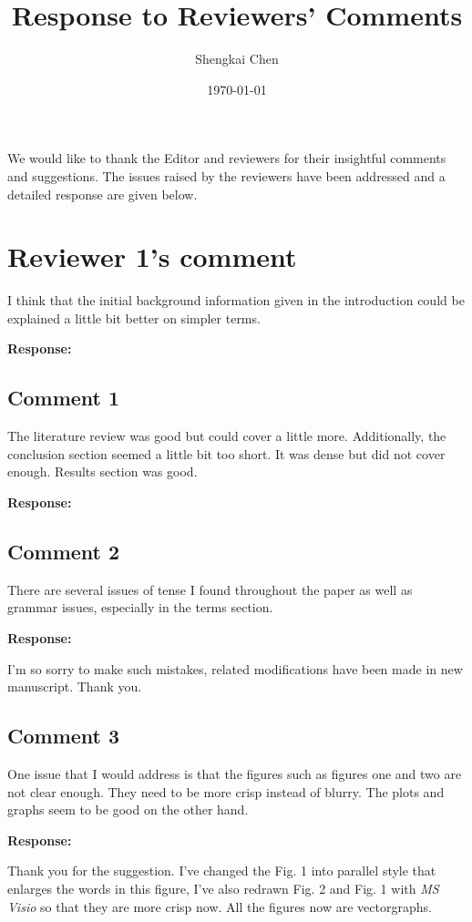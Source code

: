 \documentclass{article}
\author{Shengkai Chen}
\date{\today}
\title{Response to Reviewers' Comments}
\begin{document}
\maketitle

We would like to thank the Editor and reviewers for their insightful comments and suggestions. The issues raised by the reviewers have been addressed and a detailed response are given below.

\setlength\parindent{0pt}

\section*{Reviewer 1's comment}
I think that the initial background information given in the introduction could be explained a little bit better on simpler terms.

\textbf{Response:}


\subsection*{Comment 1} %
The literature review was good but could cover a little more. Additionally, the conclusion section seemed a little bit too short. It was dense but did not cover enough. Results section was good.

\textbf{Response:}
 

\subsection*{Comment 2} %
There are several issues of tense I found throughout the paper as well as grammar issues, especially in the terms section.

\textbf{Response:}

I'm so sorry to make such mistakes, related modifications have been made in new manuscript. Thank you.

\subsection*{Comment 3} %
One issue that I would address is that the figures such as figures one and two are not clear enough.  They need to be more crisp instead of blurry. The plots and graphs seem to be good on the other hand.

\textbf{Response:}

Thank you for the suggestion. I've changed the Fig. 1 into parallel style that enlarges the words in this figure, I've also redrawn Fig. 2 and Fig. 1 with \textit{MS Visio} so that they are more crisp now. All the figures now are vectorgraphs.
\end{document}
